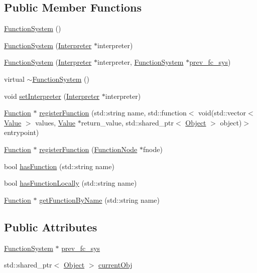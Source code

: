 \subsection*{Public Member Functions}
\begin{DoxyCompactItemize}
\item 
\hyperlink{classFunctionSystem_a66e3b5e5118f00a940c3e4a2f138c9c6}{Function\+System} ()
\item 
\hyperlink{classFunctionSystem_acad46fc5783fee1962d2450ea181f310}{Function\+System} (\hyperlink{classInterpreter}{Interpreter} $\ast$interpreter)
\item 
\hyperlink{classFunctionSystem_a720ae7e377cda0548bd8f1ef3c9390d9}{Function\+System} (\hyperlink{classInterpreter}{Interpreter} $\ast$interpreter, \hyperlink{classFunctionSystem}{Function\+System} $\ast$\hyperlink{classFunctionSystem_a0d223ca42b6d6617af61136bdb1f33dd}{prev\+\_\+fc\+\_\+sys})
\item 
virtual \hyperlink{classFunctionSystem_ad6f794406996091d08df65e8d3e0e665}{$\sim$\+Function\+System} ()
\item 
void \hyperlink{classFunctionSystem_a70175d76b5b377e58b1d3b0eebd1bc0a}{set\+Interpreter} (\hyperlink{classInterpreter}{Interpreter} $\ast$interpreter)
\item 
\hyperlink{classFunction}{Function} $\ast$ \hyperlink{classFunctionSystem_a975b09fef826151dd66dece595aa452b}{register\+Function} (std\+::string name, std\+::function$<$ void(std\+::vector$<$ \hyperlink{classValue}{Value} $>$ values, \hyperlink{classValue}{Value} $\ast$return\+\_\+value, std\+::shared\+\_\+ptr$<$ \hyperlink{classObject}{Object} $>$ object)$>$ entrypoint)
\item 
\hyperlink{classFunction}{Function} $\ast$ \hyperlink{classFunctionSystem_a1a3d54c912c91ea7656cc5a6185a9a6f}{register\+Function} (\hyperlink{classFunctionNode}{Function\+Node} $\ast$fnode)
\item 
bool \hyperlink{classFunctionSystem_a7248f494dea505ffaa2108b202f1efcb}{has\+Function} (std\+::string name)
\item 
bool \hyperlink{classFunctionSystem_a5bb3f64848489ff7cc4c982c08a10eaa}{has\+Function\+Locally} (std\+::string name)
\item 
\hyperlink{classFunction}{Function} $\ast$ \hyperlink{classFunctionSystem_a6ccd76d0760272b64790d6f5c8cdc607}{get\+Function\+By\+Name} (std\+::string name)
\end{DoxyCompactItemize}
\subsection*{Public Attributes}
\begin{DoxyCompactItemize}
\item 
\hyperlink{classFunctionSystem}{Function\+System} $\ast$ \hyperlink{classFunctionSystem_a0d223ca42b6d6617af61136bdb1f33dd}{prev\+\_\+fc\+\_\+sys}
\item 
std\+::shared\+\_\+ptr$<$ \hyperlink{classObject}{Object} $>$ \hyperlink{classFunctionSystem_a59f2a49d91338ced0a79d3898412fcaf}{current\+Obj}
\end{DoxyCompactItemize}


